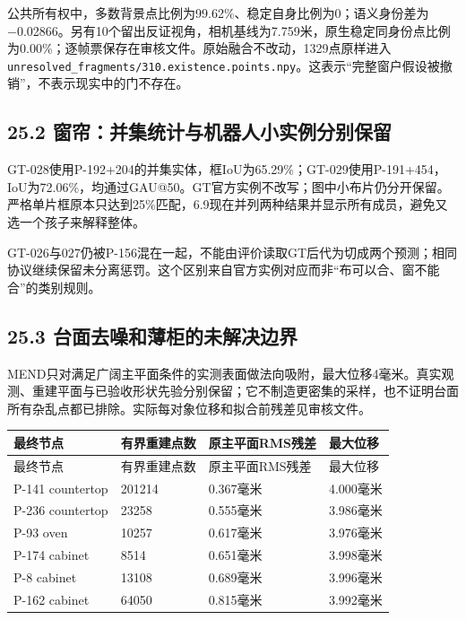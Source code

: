 \documentclass[UTF8,fontset=fandol]{ctexart}
\begin{document}
公共所有权中，多数背景点比例为99.62\%、稳定自身比例为0；语义身份差为−0.02866。另有10个留出反证视角，相机基线为7.759米，原生稳定同身份点比例为0.00\%；逐帧票保存在审核文件。原始融合不改动，1329点原样进入 \texttt{unresolved\_\allowbreak{}fragments/\allowbreak{}310.\allowbreak{}existence.\allowbreak{}points.\allowbreak{}npy}。这表示“完整窗户假设被撤销”，不表示现实中的门不存在。



\subsection*{25.2 窗帘：并集统计与机器人小实例分别保留}

GT-028使用P-192+204的并集实体，框IoU为65.29\%；GT-029使用P-191+454，IoU为72.06\%，均通过GAU@50。GT官方实例不改写；图中小布片仍分开保留。严格单片框原本只达到25\%匹配，6.9现在并列两种结果并显示所有成员，避免又选一个孩子来解释整体。



GT-026与027仍被P-156混在一起，不能由评价读取GT后代为切成两个预测；相同协议继续保留未分离惩罚。这个区别来自官方实例对应而非“布可以合、窗不能合”的类别规则。



\subsection*{25.3 台面去噪和薄柜的未解决边界}

MEND只对满足广阔主平面条件的实测表面做法向吸附，最大位移4毫米。真实观测、重建平面与已验收形状先验分别保留；它不制造更密集的采样，也不证明台面所有杂乱点都已排除。实际每对象位移和拟合前残差见审核文件。



{\small
\begin{longtable}{|p{}|p{}|p{}|p{}|}
\hline
最终节点 & 有界重建点数 & 原主平面RMS残差 & 最大位移 \\ \hline
\endfirsthead
\hline
最终节点 & 有界重建点数 & 原主平面RMS残差 & 最大位移 \\ \hline
\endhead
P-141 countertop & 201214 & 0.367毫米 & 4.000毫米 \\ \hline
P-236 countertop & 23258 & 0.555毫米 & 3.986毫米 \\ \hline
P-93 oven & 10257 & 0.617毫米 & 3.976毫米 \\ \hline
P-174 cabinet & 8514 & 0.651毫米 & 3.998毫米 \\ \hline
P-8 cabinet & 13108 & 0.689毫米 & 3.996毫米 \\ \hline
P-162 cabinet & 64050 & 0.815毫米 & 3.992毫米 \\ \hline
\end{longtable}
}
\end{document}
